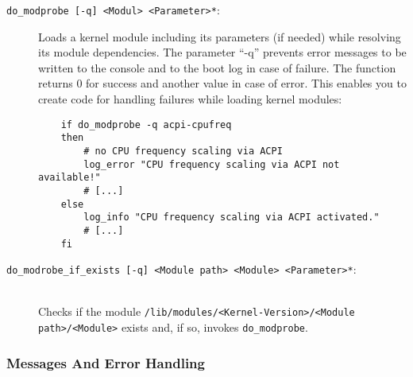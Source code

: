 \begin{description}

\item[\texttt{do\_modprobe [-q] <Modul> <Parameter>*}:]
Loads a kernel module including its parameters (if needed) while resolving
its module dependencies. The parameter ``-q'' prevents error messages to be
written to the console and to the boot log in case of failure.
The function returns 0 for success and another value in case of
error. This enables you to create code for handling failures while loading
kernel modules:

\begin{example}
\begin{verbatim}
    if do_modprobe -q acpi-cpufreq
    then
        # no CPU frequency scaling via ACPI
        log_error "CPU frequency scaling via ACPI not available!"
        # [...]
    else
        log_info "CPU frequency scaling via ACPI activated."
        # [...]
    fi
\end{verbatim}
\end{example}

\item[\texttt{do\_modrobe\_if\_exists [-q] <Module path> <Module> <Parameter>*}:]\mbox{}\\
Checks if the module \texttt{/lib/modules/<Kernel-Version>/<Module path>/<Module>}
exists and, if so, invokes \texttt{do\_modprobe}.


\end{description}

\subsubsection{Messages And Error Handling}

